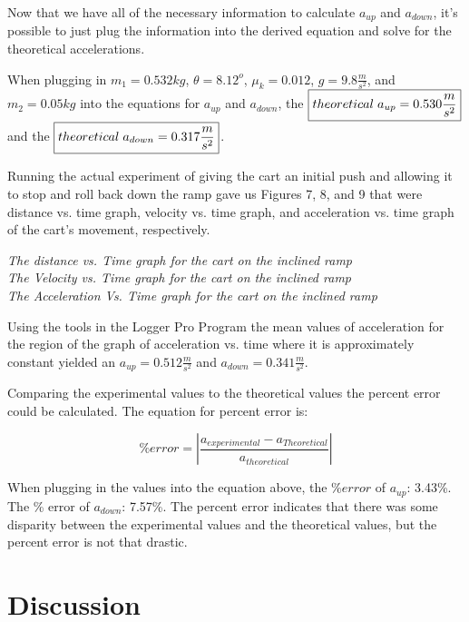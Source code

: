 \documentclass[aps,letterpaper,11pt]{revtex4}
\begin{document}
Now that we have all of the necessary information to calculate $a_{up}$ and $a_{down}$, it's possible to just plug the information into the derived equation and solve for the theoretical accelerations. 

When plugging in $m_1 = 0.532kg$, $\theta = 8.12^o$, $\mu_k = 0.012$, $g = 9.8\frac{m}{s^2}$, and $m_2 = 0.05kg$ into the equations for $a_{up}$ and $a_{down}$, the $\boxed{theoretical \hspace{1mm} a_{up} = 0.530\frac{m}{s^2}}$ and the $\boxed{theoretical  \hspace{1mm}a_{down} = 0.317\frac{m}{s^2}}$.

Running the actual experiment of giving the cart an initial push and allowing it to stop and roll back down the ramp gave us Figures 7, 8, and 9 that were distance vs. time graph, velocity vs. time graph, and acceleration vs. time graph of the cart's movement, respectively. 

\begin{center}

\textit{The distance vs. Time graph for the cart on the inclined ramp}\\

\textit{The Velocity vs. Time graph for the cart on the inclined ramp}\\

\textit{The Acceleration Vs. Time graph for the cart on the inclined ramp}\\
\end{center}


Using the tools in the Logger Pro Program the mean values of acceleration for the region of the graph of acceleration vs. time where it is approximately constant yielded an $a_{up} = 0.512\frac{m}{s^2}$ and $a_{down} = 0.341\frac{m}{s^2}$. 

Comparing the experimental values to the theoretical values the percent error could be calculated. The equation for percent error is:

$$ \% error = |\frac{a_{experimental} - a_{Theoretical}}{a_{theoretical}}|$$

When plugging in the values into the equation above, the $\% error$ of $a_{up}$: 3.43\%. The \% error of $a_{down}$: 7.57\%. The percent error indicates that there was some disparity between the experimental values and the theoretical values, but the percent error is not that drastic. 

\section{Discussion} 
\end{document}
